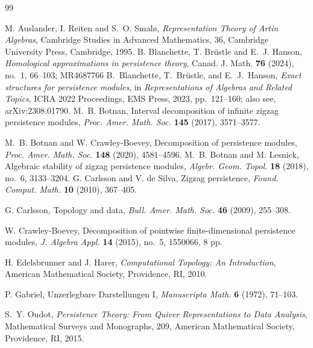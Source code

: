 \documentclass[11pt]{amsart}
\numberwithin{equation}{section}
\theoremstyle{definition}
\begin{document}
\begin{thebibliography}{99}

M. Auslander, I. Reiten and S.~O. Smal\o,
\emph{Representation Theory of Artin Algebras},
Cambridge Studies in Advanced Mathematics, 36,
Cambridge University Press, Cambridge, 1995.
 B. Blanchette, T. Br\"ustle and E.~J. Hanson, \emph{Homological approximations in persistence theory}, Canad. J. Math. {\bf 76} (2024), no.~1, 66--103; MR4687766
B.~Blanchette, T.~Br{\"u}stle, and E.~J.~Hanson,
\emph{Exact structures for persistence modules},
in \emph{Representations of Algebras and Related Topics},
ICRA 2022 Proceedings, EMS Press, 2023, pp.~121--160; also see, 
arXiv:2308.01790. 
M.~B. Botnan,
Interval decomposition of infinite zigzag persistence modules,
\emph{Proc. Amer. Math. Soc.} \textbf{145} (2017), 3571--3577.

M.~B. Botnan and W. Crawley-Boevey,
Decomposition of persistence modules,
\emph{Proc. Amer. Math. Soc.} \textbf{148} (2020), 4581--4596.
M.~B. Botnan and M. Lesnick,
Algebraic stability of zigzag persistence modules,
\emph{Algebr. Geom. Topol.} \textbf{18} (2018), no.~6, 3133--3204.
G. Carlsson and V. de Silva,
Zigzag persistence,
\emph{Found. Comput. Math.} \textbf{10} (2010), 367--405.

G. Carlsson,
Topology and data,
\emph{Bull. Amer. Math. Soc.} \textbf{46} (2009), 255--308.

W. Crawley-Boevey,
Decomposition of pointwise finite-dimensional persistence modules,
\emph{J. Algebra Appl.} \textbf{14} (2015), no.~5, 1550066, 8 pp.

H. Edelsbrunner and J. Harer,
\emph{Computational Topology: An Introduction},
American Mathematical Society, Providence, RI, 2010.

P. Gabriel,
Unzerlegbare Darstellungen I,
\emph{Manuscripta Math.} \textbf{6} (1972), 71--103.

S.~Y. Oudot,
\emph{Persistence Theory: From Quiver Representations to Data Analysis},
Mathematical Surveys and Monographs, 209,
American Mathematical Society, Providence, RI, 2015.

\end{thebibliography}
\end{document}
